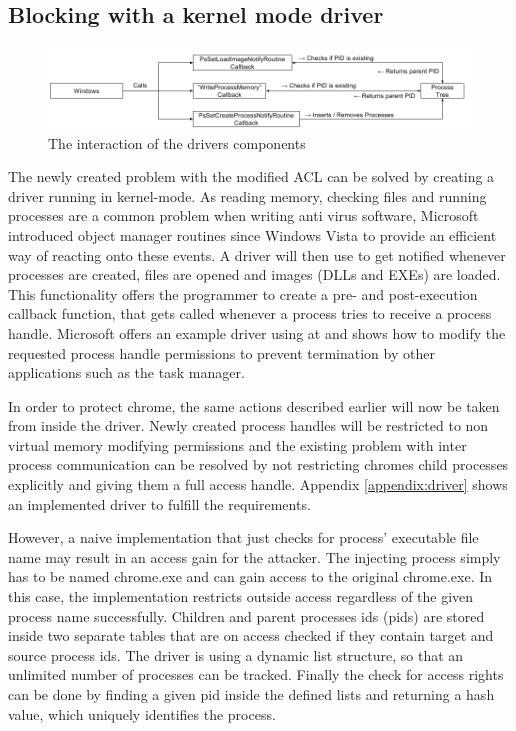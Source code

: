 \subsection{Blocking  with a kernel mode driver}
\begin{figure}[h]
\centering
\includegraphics[angle=90,scale=0.6]{sections/implementation/interaction.png}
\caption{The interaction of the drivers components}
\label{fig:interaction}
\end{figure}
The newly created problem with the modified ACL can be solved by creating a driver running in kernel-mode. As reading memory, checking files and running processes are a common problem when writing anti virus software, Microsoft introduced object manager routines since Windows Vista to provide an efficient way of reacting onto these events. A driver will then use  to get notified whenever processes are created, files are opened and images (DLLs and EXEs) are loaded. This functionality offers the programmer to create a pre- and post-execution callback function, that gets called whenever a process tries to receive a process handle. Microsoft offers an example driver using  at \cite{github_obcallback} and shows how to modify the requested process handle permissions to prevent termination by other applications such as the task manager. 

In order to protect chrome, the same actions described earlier will now be taken from inside the driver. Newly created process handles will be restricted to non virtual memory modifying permissions and the existing problem with inter process communication can be resolved by not restricting chromes child processes explicitly and giving them a full access handle. Appendix \ref{appendix:driver} shows an implemented driver to fulfill the requirements.

However, a naive implementation that just checks for process' executable file name may result in an access gain for the attacker. The injecting process simply has to be named chrome.exe and can gain access to the original chrome.exe. In this case, the implementation restricts outside access regardless of the given process name successfully. Children and parent processes ids (pids) are stored inside two separate tables that are on access checked if they contain target and source process ids. The driver is using a dynamic list structure, so that an unlimited number of processes can be tracked. Finally the check for access rights can be done by finding a given pid inside the defined lists and returning a hash value, which uniquely identifies the process. 

